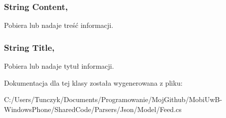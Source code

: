 \subsubsection[{Content}]{\setlength{\rightskip}{0pt plus 5cm}String Content\hspace{0.3cm}{\ttfamily [get]}, {\ttfamily [set]}}\label{a00019_a3bc3a779aa2cfe2818e6d9233fecdbf0}


Pobiera lub nadaje treść informacji. 

\hypertarget{a00019_ab2cd177dd6c3c9b4e127e1b2a37c7ef7}{}
\subsubsection[{Title}]{\setlength{\rightskip}{0pt plus 5cm}String Title\hspace{0.3cm}{\ttfamily [get]}, {\ttfamily [set]}}\label{a00019_ab2cd177dd6c3c9b4e127e1b2a37c7ef7}


Pobiera lub nadaje tytuł informacji. 



Dokumentacja dla tej klasy została wygenerowana z pliku\+:\begin{DoxyCompactItemize}
\item 
C\+:/\+Users/\+Tunczyk/\+Documents/\+Programowanie/\+Moj\+Github/\+Mobi\+Uw\+B-\/\+Windows\+Phone/\+Shared\+Code/\+Parsers/\+Json/\+Model/Feed.\+cs\end{DoxyCompactItemize}
